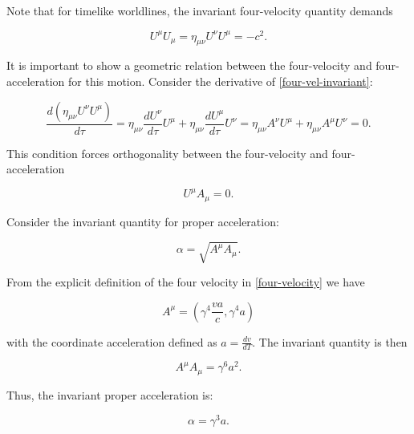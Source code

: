 \documentclass[11pt]{article}
\begin{document}
Note that for timelike worldlines, the invariant four-velocity quantity demands

\begin{equation}
    \label{four-vel-invariant}
    U^{\mu}U_{\mu} = \eta_{\mu \nu} U^{\nu} U^{\mu} = -c^2.
\end{equation}

It is important to show a geometric relation between the four-velocity and four-acceleration for this motion. Consider the derivative of \eqref{four-vel-invariant}:

\begin{equation}
    \label{four-vel-derivative}
    \frac{d \left( \eta_{\mu \nu} U^{\nu} U^{\mu}\right)} {d \tau} = \eta_{\mu \nu} \frac{dU^{\nu}}{d \tau} U^{\mu} + \eta_{\mu \nu} \frac{dU^{\mu}}{d \tau} U^{\nu} = \eta_{\mu \nu} A^{\nu} U^{\mu} + \eta_{\mu \nu} A^{\mu} U^{\nu} = 0.
\end{equation}

This condition forces orthogonality between the four-velocity and four-acceleration

\begin{equation}
    \label{four-vel-acc-orthogonal}
    U^{\mu} A_{\mu} = 0.
\end{equation}

Consider the invariant quantity for proper acceleration:

\begin{equation}
    \label{proper-acc-invariant}
    \alpha = \sqrt{A^{\mu} A_{\mu}}.
\end{equation}

From the explicit definition of the four velocity in \eqref{four-velocity} we have

\begin{equation}
    \label{four-acc-deriv-def}
    A^{\mu} = (\gamma^4 \frac{va}{c}, \gamma^4 a)
\end{equation}

with the coordinate acceleration defined as $a = \frac{dv}{dT}$. The invariant quantity is then

\begin{equation}
    \label{proper-acc-invariant-explicit}
    A^{\mu} A_{\mu} = \gamma^6 a^2.
\end{equation}

Thus, the invariant proper acceleration is:

\begin{equation}
    \label{alpha-proper-acc-invariant}
    \alpha = \gamma^3 a.
\end{equation}
\end{document}
